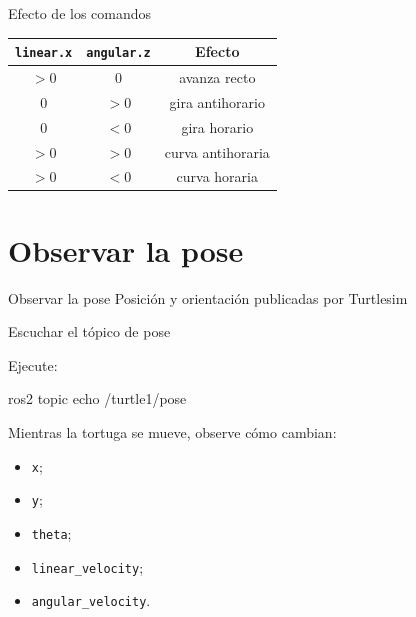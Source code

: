 \documentclass[aspectratio=169]{beamer}
\begin{document}
\begin{frame}{Efecto de los comandos}

\begin{center}
    \begin{tabular}{ccc}
        \toprule
        \textbf{\texttt{linear.x}} & \textbf{\texttt{angular.z}} & \textbf{Efecto} \\
        \midrule
        $>0$ & $0$ & avanza recto \\
        $0$ & $>0$ & gira antihorario \\
        $0$ & $<0$ & gira horario \\
        $>0$ & $>0$ & curva antihoraria \\
        $>0$ & $<0$ & curva horaria \\
        \bottomrule
    \end{tabular}
\end{center}

\vspace{0.3cm}


\end{frame}

\section{Observar la pose}

\SectionSlide
{Observar la pose}
{Posición y orientación publicadas por Turtlesim}

\begin{frame}[fragile]{Escuchar el tópico de pose}

Ejecute:

\begin{bashcodedark}
    ros2 topic echo /turtle1/pose
\end{bashcodedark}

Mientras la tortuga se mueve, observe cómo cambian:

\begin{itemize}
    \item \texttt{x};
    \item \texttt{y};
    \item \texttt{theta};
    \item \texttt{linear\_velocity};
    \item \texttt{angular\_velocity}.
\end{itemize}

\end{frame}
\end{document}
